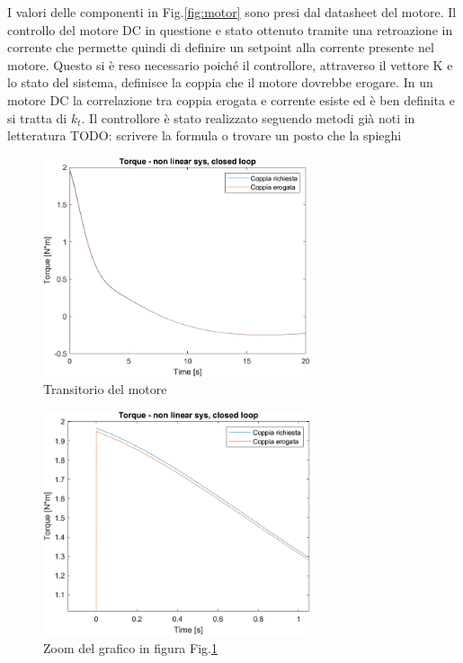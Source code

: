 I valori delle componenti in Fig.\ref{fig:motor} sono presi dal datasheet del motore.
Il controllo del motore DC in questione e stato ottenuto tramite una retroazione in corrente che permette quindi di definire un setpoint alla corrente presente nel motore. Questo si è reso necessario poiché il controllore, attraverso il vettore K e lo stato del sistema, definisce la coppia che il motore dovrebbe erogare. In un motore DC la correlazione tra coppia erogata e corrente esiste ed è ben definita e si tratta di $k_t$.
Il controllore è stato realizzato seguendo metodi già noti in letteratura TODO: scrivere la formula o trovare un posto che la spieghi 
\begin{figure}[H]
	\centering   	
	\includegraphics[width=0.7\textwidth]{Immagini/motore.png}
	\caption{Transitorio del motore}
	\label{fig:motore}
\end{figure}
\begin{figure}[H]
	\centering   	
	\includegraphics[width=0.7\textwidth]{Immagini/motore_zoom.png}
	\caption{Zoom del grafico in figura Fig.\ref{fig:motore}}
	\label{fig:motore_zoom}
\end{figure}

